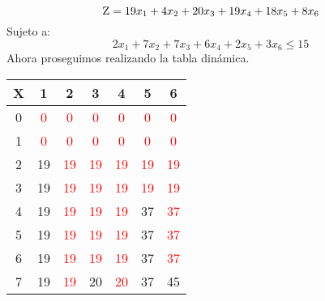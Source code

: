 \documentclass[10pt,letterpaper]{article}
\begin{document}
\[ \textsc{\normalsize Z}\\[0.5cm] = 19x_{1}+4x_{2}+20x_{3}+19x_{4}+18x_{5}+8x_{6} \]
Sujeto a: 
\[ 2x_{1}+7x_{2}+7x_{3}+6x_{4}+2x_{5}+3x_{6} \leq 15 \]
\newline Ahora proseguimos realizando la tabla dinámica.
\begin{center}
\begin{tabu} to 1.0\textwidth { | c | c | c | c | c | c | c | }
\hline
{}\color{black}\textbf{X} & \color{black}\textbf{1} & \color{black}\textbf{2} & \color{black}\textbf{3} & \color{black}\textbf{4} & \color{black}\textbf{5} & \color{black}\textbf{6} \\ 
\hline
{}\color{black}0 & \textcolor{red}{ 0} & \textcolor{red}{ 0} & \textcolor{red}{ 0} & \textcolor{red}{ 0} & \textcolor{red}{ 0} & \textcolor{red}{ 0} \\ 
\hline
{}\color{black}1 & \textcolor{red}{ 0} & \textcolor{red}{ 0} & \textcolor{red}{ 0} & \textcolor{red}{ 0} & \textcolor{red}{ 0} & \textcolor{red}{ 0} \\ 
\hline
{}\color{black}2 & \textcolor{GreenBlack}{ 19} & \textcolor{red}{ 19} & \textcolor{red}{ 19} & \textcolor{red}{ 19} & \textcolor{red}{ 19} & \textcolor{red}{ 19} \\ 
\hline
{}\color{black}3 & \textcolor{GreenBlack}{ 19} & \textcolor{red}{ 19} & \textcolor{red}{ 19} & \textcolor{red}{ 19} & \textcolor{red}{ 19} & \textcolor{red}{ 19} \\ 
\hline
{}\color{black}4 & \textcolor{GreenBlack}{ 19} & \textcolor{red}{ 19} & \textcolor{red}{ 19} & \textcolor{red}{ 19} & \textcolor{GreenBlack}{ 37} & \textcolor{red}{ 37} \\ 
\hline
{}\color{black}5 & \textcolor{GreenBlack}{ 19} & \textcolor{red}{ 19} & \textcolor{red}{ 19} & \textcolor{red}{ 19} & \textcolor{GreenBlack}{ 37} & \textcolor{red}{ 37} \\ 
\hline
{}\color{black}6 & \textcolor{GreenBlack}{ 19} & \textcolor{red}{ 19} & \textcolor{red}{ 19} & \textcolor{red}{ 19} & \textcolor{GreenBlack}{ 37} & \textcolor{red}{ 37} \\ 
\hline
{}\color{black}7 & \textcolor{GreenBlack}{ 19} & \textcolor{red}{ 19} & \textcolor{GreenBlack}{ 20} & \textcolor{red}{ 20} & \textcolor{GreenBlack}{ 37} & \textcolor{GreenBlack}{ 45} \\ 

\end{tabu}
\end{center}
\end{document}
